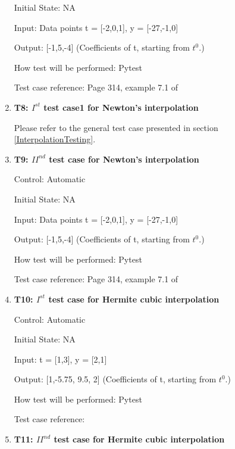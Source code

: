 \documentclass[12pt, titlepage]{article}
\begin{document}
\begin{enumerate}
Initial State: NA

Input: Data points t = [-2,0,1], y = [-27,-1,0]

Output: [-1,5,-4] (Coefficients of t, starting from $t^{0}$.)

How test will be performed: Pytest

Test case reference: Page 314, example 7.1 of  ~\cite{Health1997}\\


\item{\textbf{T8: $I^{st}$ test case1 for Newton's interpolation} \\}

Please refer to the general test case presented in section 
\ref{InterpolationTesting}.


\item{\textbf{T9: ${II}^{nd}$ test case for Newton's interpolation} \\}

Control: Automatic

Initial State: NA

Input: Data points t = [-2,0,1], y = [-27,-1,0]

Output: [-1,5,-4] (Coefficients of t, starting from $t^{0}$.)

How test will be performed: Pytest

Test case reference: Page 314, example 7.1 of \cite{Health1997}\\




\item{\textbf{T10: $I^{st}$ test case for Hermite cubic interpolation }\\}

Control: Automatic 

Initial State: NA

Input: t = [1,3], y = [2,1]

Output: [1,-5.75, 9.5, 2] (Coefficients of t, starting from $t^{0}$.)


How test will be performed: Pytest

Test case reference: \cite{HermiteCubic} \\

\item{\textbf{T11: ${II}^{nd}$ test case for Hermite  
cubic 
interpolation} \\}


\end{enumerate}
\end{document}
